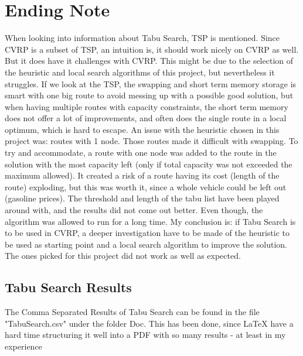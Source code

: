 \documentclass[12pt]{article}
\begin{document}
\section{Ending Note}
When looking into information about Tabu Search, TSP is mentioned. Since CVRP is a subset of TSP, an intuition is, it should work nicely on CVRP as well. But it does have it challenges with CVRP. This might be due to the selection of the heuristic and local search algorithms of this project, but nevertheless it struggles. If we look at the TSP, the swapping and short term memory storage is smart with one big route to avoid messing up with a possible good solution, but when having multiple routes with capacity constraints, the short term memory does not offer a lot of improvements, and often does the single route in a local optimum, which is hard to escape. 
An issue with the heuristic chosen in this project was: routes with 1 node. Those routes made it difficult with swapping. To try and accommodate, a route with one node was added to the route in the solution with the most capacity left (only if total capacity was not exceeded the maximum allowed). It created a risk of a route having its cost (length of the route) exploding, but this was worth it, since a whole vehicle could be left out (gasoline prices).
The threshold and length of the tabu list have been played around with, and the results did not come out better. Even though, the algorithm was allowed to run for a long time.  
My conclusion is: if Tabu Search is to be used in CVRP, a deeper investigation have to be made of the heuristic to be used as starting point and a local search algorithm to improve the solution. The ones picked for this project did not work as well as expected.

\newpage


\newpage
\begin{appendices}

\section{Tabu Search Results}

The Comma Separated Results of Tabu Search can be found in the file "TabuSearch.csv" under the folder Doc. This has been done, since LaTeX have a hard time structuring it well into a PDF with so many results - at least in my experience

\end{appendices}
\end{document}
